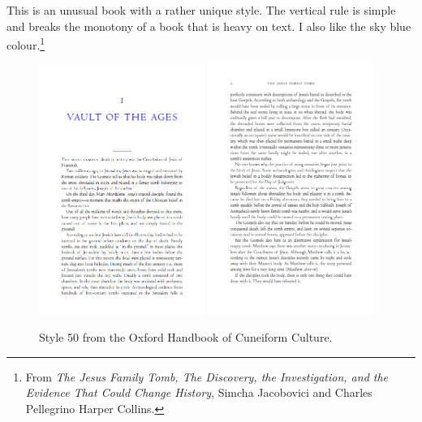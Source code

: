 This is an unusual book with a rather unique style. The vertical rule is simple and breaks the monotony of a book that is heavy on text. I also like the sky blue colour.\footnote{From \textit{The
Jesus
Family
Tomb,   
The Discovery, the Investigation,
and the Evidence
That Could Change History}, 
Simcha Jacobovici and Charles Pellegrino
Harper Collins.}
\begin{figure}[ht]
\includegraphics[width=0.48\textwidth]{./chapters/chapter53}\hfill
\includegraphics[width=0.48\textwidth]{./chapters/chapter53a}
\caption{Style 50 from the Oxford Handbook of Cuneiform Culture.}
\end{figure}


\lipsum

